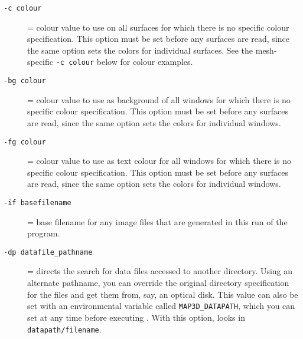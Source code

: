 \begin{description}
  \item [{\tt -c colour}] = colour value to use on all
    surfaces for which there is no specific colour specification.  
    This option must be set before any surfaces are read, since the 
    same option sets the colors for individual surfaces.  See the 
    mesh-specific {\tt -c colour} below for colour examples. 
    
  \item [{\tt -bg colour}] = colour value to use as background of all
    windows for which there is no specific colour specification.  
    This option must be set before any surfaces are read, since the 
    same option sets the colors for individual windows.
    
  \item [{\tt -fg colour}] = colour value to use as text colour for all
    windows for which there is no specific colour specification.  
    This option must be set before any surfaces are read, since the 
    same option sets the colors for individual windows.
    

  \item [{\tt -if basefilename}] = base filename for any image files that
        are generated in this run of the program.

  \item[{\tt -dp datafile\_pathname}] = directs the search for data files
        accessed to another directory.  Using an alternate pathname, 
        you can override the
        original directory specification for the files and get them from,
        say, an optical disk.  This value can also be set with an
        environmental variable called {\tt MAP3D\_DATAPATH}, which you can
        set at any time before executing \map{}.  With this option, \map{}
        looks in {\tt datapath/filename}.




\end{description}
